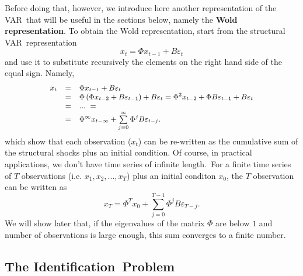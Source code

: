 \documentclass[10pt]{article}
\begin{document}
Before doing that, however, we introduce here another representation of the
VAR\ that will be useful in the sections below, namely the \textbf{Wold
representation}. To obtain the Wold representation, start from the
structural VAR\ representation 
\begin{equation}
x_{t}=\Phi x_{t-1}+B\varepsilon _{t}  \label{eq:struct_var_4}
\end{equation}%
and use it to substitute recursively the elements on the right hand side of
the equal sign. Namely, 
\begin{equation}
{\small 
\begin{array}{lll}
x_{t} & = & \Phi x_{t-1}+B\varepsilon _{t} \\ 
& = & \Phi \left( \Phi x_{t-2}+B\varepsilon _{t-1}\right) +B\varepsilon
_{t}=\Phi ^{2}x_{t-2}+\Phi B\varepsilon _{t-1}+B\varepsilon _{t} \\ 
& = & ...\ = \\ 
& = & \Phi ^{\infty }x_{t-\infty }+\sum\limits_{j=0}^{\infty }\Phi
^{j}B\varepsilon _{t-j}.%
\end{array}%
}  \label{eq:struct_wold}
\end{equation}%
which show that each observation ($x_{t}$) can be re-written as the
cumulative sum of the structural shocks plus an initial condition. Of
course, in practical applications, we don't have time series of infinite
length.\ For a finite time series of $T$ observations (i.e. $%
x_{1},x_{2},...,x_{T}$) plus an initial conditon $x_{0}$, the $T$
observation can be written as%
\begin{equation}
x_{T}=\Phi ^{T}x_{0}+\sum\limits_{j=0}^{T-1}\Phi ^{j}B\varepsilon _{T-j}.
\label{eq:struct_wold_1}
\end{equation}%
We will show later that, if the eigenvalues of the matrix $\Phi $ are below $%
1$ and number of observations is large enough, this sum converges to a
finite number.

\subsection{The Identification\ Problem}
\end{document}
